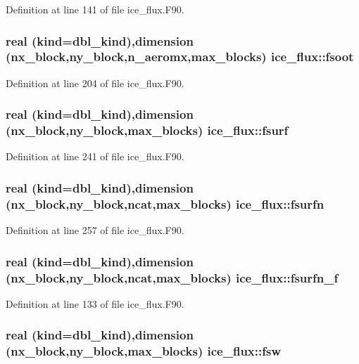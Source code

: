 Definition at line 141 of file ice\_\-flux.F90.\hypertarget{namespaceice__flux_a7b0cfe6f97cfa89da6c797550ce6c4f0}{
\subsubsection[{fsoot}]{\setlength{\rightskip}{0pt plus 5cm}real (kind=dbl\_\-kind),dimension (nx\_\-block,ny\_\-block,n\_\-aeromx,max\_\-blocks) {\bf ice\_\-flux::fsoot}}}
\label{namespaceice__flux_a7b0cfe6f97cfa89da6c797550ce6c4f0}


Definition at line 204 of file ice\_\-flux.F90.\hypertarget{namespaceice__flux_a27dbd3d1fc36c0ddb4c39c806d935775}{
\subsubsection[{fsurf}]{\setlength{\rightskip}{0pt plus 5cm}real (kind=dbl\_\-kind),dimension (nx\_\-block,ny\_\-block,max\_\-blocks) {\bf ice\_\-flux::fsurf}}}
\label{namespaceice__flux_a27dbd3d1fc36c0ddb4c39c806d935775}


Definition at line 241 of file ice\_\-flux.F90.\hypertarget{namespaceice__flux_aa05e0fe10c9628c94efe017d79f0cd1e}{
\subsubsection[{fsurfn}]{\setlength{\rightskip}{0pt plus 5cm}real (kind=dbl\_\-kind),dimension (nx\_\-block,ny\_\-block,ncat,max\_\-blocks) {\bf ice\_\-flux::fsurfn}}}
\label{namespaceice__flux_aa05e0fe10c9628c94efe017d79f0cd1e}


Definition at line 257 of file ice\_\-flux.F90.\hypertarget{namespaceice__flux_a248789dd1933e5c3a277f54582b46099}{
\subsubsection[{fsurfn\_\-f}]{\setlength{\rightskip}{0pt plus 5cm}real (kind=dbl\_\-kind),dimension (nx\_\-block,ny\_\-block,ncat,max\_\-blocks) {\bf ice\_\-flux::fsurfn\_\-f}}}
\label{namespaceice__flux_a248789dd1933e5c3a277f54582b46099}


Definition at line 133 of file ice\_\-flux.F90.\hypertarget{namespaceice__flux_acc02310f399ca37f700f432975393813}{
\subsubsection[{fsw}]{\setlength{\rightskip}{0pt plus 5cm}real (kind=dbl\_\-kind),dimension (nx\_\-block,ny\_\-block,max\_\-blocks) {\bf ice\_\-flux::fsw}}}
\label{namespaceice__flux_acc02310f399ca37f700f432975393813}



